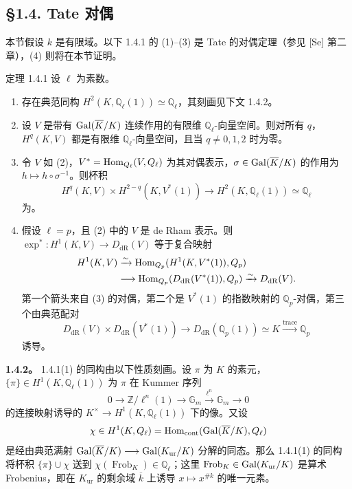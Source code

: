 \subsection*{§1.4. Tate 对偶}
本节假设 $k$ 是有限域。以下 1.4.1 的 (1)--(3) 是 Tate 的对偶定理（参见 [Se] 第二章），(4) 则将在本节证明。
\begin{statement}{定理 1.4.1}
设 $\ell$ 为素数。
\begin{enumerate}[label=(\arabic*)]
\item 存在典范同构 $H^2(K,\mathbb Q_\ell(1))\simeq\mathbb Q_\ell$，其刻画见下文 1.4.2。
\item 设 $V$ 是带有 $\operatorname{Gal}(\overline K/K)$ 连续作用的有限维 $\mathbb Q_\ell$-向量空间。则对所有 $q$，$H^q(K,V)$ 都是有限维 $\mathbb Q_\ell$-向量空间，且当 $q\ne0,1,2$ 时为零。
\item 令 $V$ 如 (2)，$V^*=\operatorname{Hom}_{Q_\ell}(V,Q_\ell)$ 为其对偶表示，$\sigma\in\operatorname{Gal}(\overline K/K)$ 的作用为 $h\mapsto h\circ\sigma^{-1}$。则杯积
\[
 H^q(K,V)\times H^{2-q}(K,V^*(1))\longrightarrow H^2(K,\mathbb Q_\ell(1))\simeq\mathbb Q_\ell
\]
为。
\item 假设 $\ell=p$，且 (2) 中的 $V$ 是 de Rham 表示。则 $\exp^*:H^1(K,V)\longrightarrow D_{\mathrm{dR}}(V)$ 等于复合映射
\begin{align*}
 H^1(K,V)&\xrightarrow{\sim}\operatorname{Hom}_{Q_p}(H^1(K,V^*(1)),Q_p)\\
 &\longrightarrow\operatorname{Hom}_{Q_p}(D_{\mathrm{dR}}(V^*(1)),Q_p)\xrightarrow{\sim}D_{\mathrm{dR}}(V).
\end{align*}
第一个箭头来自 (3) 的对偶，第二个是 $V^*(1)$ 的指数映射的 $\mathbb Q_p$-对偶，第三个由典范配对
\[
 D_{\mathrm{dR}}(V)\times D_{\mathrm{dR}}(V^*(1))\longrightarrow D_{\mathrm{dR}}(\mathbb Q_p(1))\simeq K\xrightarrow{\mathrm{trace}}\mathbb Q_p
\]
诱导。
\end{enumerate}
\end{statement}

\textbf{1.4.2。} 1.4.1(1) 的同构由以下性质刻画。设 $\pi$ 为 $K$ 的素元，$\{\pi\}\in H^1(K,\mathbb Q_\ell(1))$ 为 $\pi$ 在 Kummer 序列
\[
 0\longrightarrow\mathbb Z/\ell^n(1)\longrightarrow\mathbb G_m\xrightarrow{\ell^n}\mathbb G_m\longrightarrow0
\]
的连接映射诱导的 $K^\times\longrightarrow H^1(K,\mathbb Q_\ell(1))$ 下的像。又设
\[
 \chi\in H^1(K,Q_\ell)=\operatorname{Hom}_{\mathrm{cont}}(\operatorname{Gal}(\overline K/K),Q_\ell)
\]
是经由典范满射 $\operatorname{Gal}(\overline K/K)\longrightarrow\operatorname{Gal}(K_{\mathrm{ur}}/K)$ 分解的同态。那么 1.4.1(1) 的同构将杯积 $\{\pi\}\cup\chi$ 送到 $\chi(\operatorname{Frob}_K)\in\mathbb Q_\ell$；这里 $\operatorname{Frob}_K\in\operatorname{Gal}(K_{\mathrm{ur}}/K)$ 是算术 Frobenius，即在 $K_{\mathrm{ur}}$ 的剩余域 $\overline k$ 上诱导 $x\mapsto x^{\#k}$ 的唯一元素。

